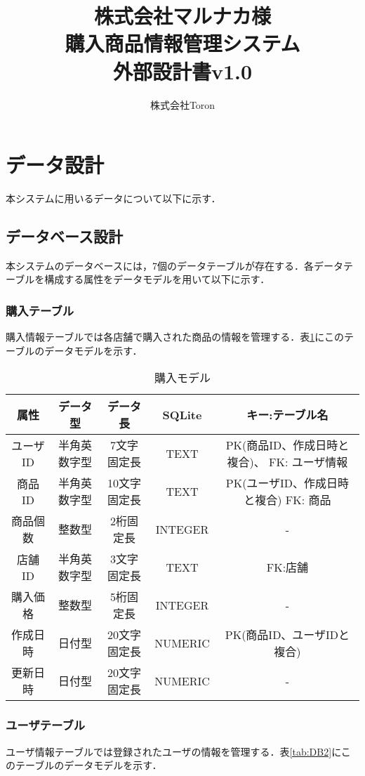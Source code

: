 \documentclass[a4j]{jarticle}
\title{
\vspace{30mm}
株式会社マルナカ様\\
購入商品情報管理システム\\
外部設計書v1.0
\vspace{90mm}
}
\author{
株式会社Toron
}
\begin{document}
\maketitle
\newpage
\tableofcontents
\newpage
\section{データ設計}
本システムに用いるデータについて以下に示す．
\subsection{データベース設計}
本システムのデータベースには，7個のデータテーブルが存在する．各データテーブルを構成する属性をデータモデルを用いて以下に示す．
\subsubsection{購入テーブル}
購入情報テーブルでは各店舗で購入された商品の情報を管理する．表\ref{tab:DB1}にこのテーブルのデータモデルを示す．
\begin{table}[H]
\caption{購入モデル}
\label{tab:DB1}
\begin{center}
\begin{tabular}{|c|c|c|c|c|}
\hline
属性　&データ型&データ長&SQLite&キー:テーブル名\\ \hline\hline
ユーザID &半角英数字型&7文字固定長&TEXT&PK(商品ID、作成日時と複合)、 FK: ユーザ情報 \\ \hline
商品ID &半角英数字型&10文字固定長&TEXT&PK(ユーザID、作成日時と複合) FK: 商品\\ \hline
商品個数 &整数型&2桁固定長&INTEGER&- \\ \hline
店舗ID &半角英数字型&3文字固定長&TEXT&FK:店舗 \\ \hline
購入価格&整数型&5桁固定長&INTEGER&- \\ \hline
作成日時  &日付型&20文字固定長&NUMERIC&PK(商品ID、ユーザIDと複合) \\ \hline
更新日時 &日付型&20文字固定長&NUMERIC&-  \\ \hline
\end{tabular}
\end{center}
\end{table}
\subsubsection{ユーザテーブル}
ユーザ情報テーブルでは登録されたユーザの情報を管理する．表\ref{tab:DB2}にこのテーブルのデータモデルを示す．
\end{document}
